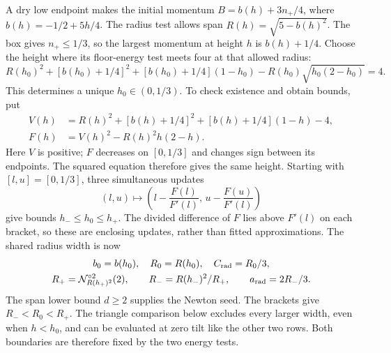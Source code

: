 A dry low endpoint makes the initial momentum
$B=b(h)+3n_+/4$, where $b(h)=-1/2+5h/4$.
The radius test allows span $R(h)=\sqrt{5-b(h)^2}$.
The box gives $n_+\le1/3$, so the largest momentum at height $h$
is $b(h)+1/4$. Choose the height where its floor-energy test meets
four at that allowed radius:
\begin{equation}\label{eq:tilted-balance-height}
 R(h_0)^2+[b(h_0)+1/4]^2+[b(h_0)+1/4](1-h_0)
 -R(h_0)\sqrt{h_0(2-h_0)}=4.
\end{equation}
This determines a unique $h_0\in(0,1/3)$.
To check existence and obtain bounds, put
\[
 \begin{aligned}
 V(h)&=R(h)^2+[b(h)+1/4]^2+[b(h)+1/4](1-h)-4,\\
 F(h)&=V(h)^2-R(h)^2h(2-h).
 \end{aligned}
\]
Here $V$ is positive; $F$ decreases on $[0,1/3]$ and changes sign
between its endpoints. The squared equation therefore gives the
same height. Starting with $[l,u]=[0,1/3]$, three simultaneous updates
\[
 (l,u)\longmapsto\left(l-\frac{F(l)}{F'(l)},\,
                        u-\frac{F(u)}{F'(l)}\right)
\]
give bounds $h_-\le h_0\le h_+$.
The divided difference of $F$ lies above $F'(l)$ on each bracket,
so these are enclosing updates, rather than fitted approximations.
The shared radius width is now
\begin{equation}\label{eq:tilted-radius-width}
\begin{gathered}
b_0=b(h_0),\quad R_0=R(h_0),\quad C_{\rm rad}=R_0/3,\\
R_+=\mathcal N_{R(h_+)^2}^{\circ2}(2),\qquad
R_-=R(h_-)^2/R_+,\qquad a_{\rm rad}=2R_-/3.
\end{gathered}
\end{equation}
The span lower bound $d\ge2$ supplies the Newton seed.
The brackets give $R_-<R_0<R_+$.
The triangle comparison below excludes every larger width, even when
$h<h_0$, and can be evaluated at zero tilt like the other two rows.
Both boundaries are therefore fixed by the two energy tests.

